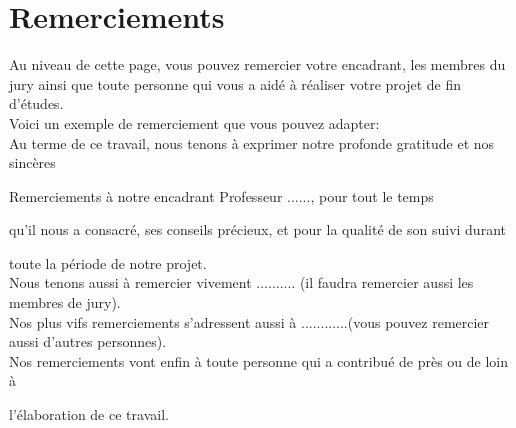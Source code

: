 \chapter*{Remerciements}


Au niveau de cette page, vous pouvez remercier votre encadrant, les membres du jury ainsi que toute personne qui vous a aidé à réaliser votre projet de fin d'études.\\

Voici un exemple de remerciement que vous pouvez adapter:\\

Au terme de ce travail, nous tenons à exprimer notre profonde gratitude et nos sincères 

Remerciements à  notre encadrant Professeur ......, pour tout le temps 

qu'il nous a consacré, ses conseils précieux, et pour la qualité de son suivi durant  

toute la période de notre projet.\\

Nous tenons aussi à remercier vivement  .......... (il faudra remercier aussi les membres de jury). \\

Nos plus vifs remerciements s'adressent aussi à ............(vous pouvez remercier aussi d'autres personnes).\\

Nos remerciements vont enfin à toute personne qui a contribué de près ou de loin à 

l'élaboration de ce travail.



